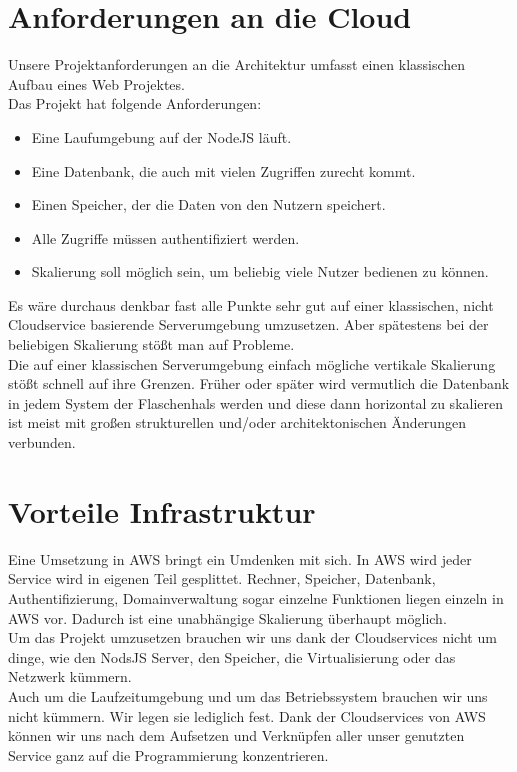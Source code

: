 \documentclass[a4paper, 12pt]{scrreprt}
\begin{document}
\section{Anforderungen an die Cloud}
Unsere Projektanforderungen an die Architektur umfasst einen klassischen Aufbau eines Web Projektes. \\
Das Projekt hat folgende Anforderungen:
\begin{itemize}
\item Eine Laufumgebung auf der NodeJS läuft.
\item Eine Datenbank, die auch mit vielen Zugriffen zurecht kommt. 
\item Einen Speicher, der die Daten von den Nutzern speichert.
\item Alle Zugriffe müssen authentifiziert werden.
\item Skalierung soll möglich sein, um beliebig viele Nutzer bedienen zu können.
\end{itemize}
Es wäre durchaus denkbar fast alle Punkte sehr gut auf einer klassischen, nicht Cloudservice basierende Serverumgebung umzusetzen. Aber spätestens bei der beliebigen Skalierung stößt man auf Probleme. 
\\
Die auf einer klassischen Serverumgebung einfach mögliche vertikale Skalierung stößt schnell auf ihre Grenzen. Früher oder später wird vermutlich die Datenbank in jedem System der Flaschenhals werden und diese dann horizontal zu skalieren ist meist mit großen strukturellen und/oder architektonischen Änderungen verbunden.

\section{Vorteile Infrastruktur}
Eine Umsetzung in AWS bringt ein Umdenken mit sich. In AWS wird jeder Service wird in eigenen Teil gesplittet. Rechner, Speicher, Datenbank, Authentifizierung, Domainverwaltung sogar einzelne Funktionen liegen einzeln in AWS vor. Dadurch ist eine unabhängige Skalierung überhaupt möglich. \\
Um das Projekt umzusetzen brauchen wir uns dank der Cloudservices nicht um dinge, wie den NodsJS Server, den Speicher, die Virtualisierung oder das Netzwerk kümmern. \\
Auch um die Laufzeitumgebung und um das Betriebssystem brauchen wir uns nicht kümmern. Wir legen sie lediglich fest. Dank der Cloudservices von AWS können wir uns nach dem Aufsetzen und Verknüpfen aller unser genutzten Service ganz auf die Programmierung konzentrieren.
\end{document}
